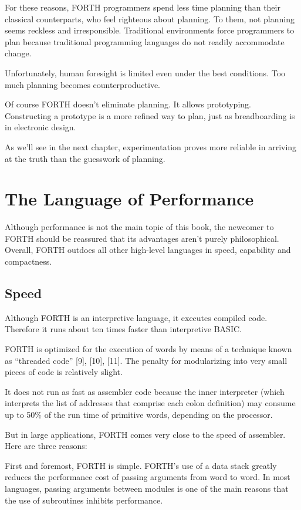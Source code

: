 For these reasons, FORTH programmers spend less time planning than
their classical counterparts, who feel righteous about planning. To
them, not planning seems reckless and irresponsible. Traditional environments
force programmers to plan because traditional programming languages
do not readily accommodate change.

Unfortunately, human foresight is limited even under the best conditions.
Too much planning becomes counterproductive.

Of course FORTH doesn't eliminate planning. It allows prototyping.
Constructing a prototype is a more refined way to plan, just as breadboarding
is in electronic design.

As we'll see in the next chapter, experimentation proves more reliable
in arriving at the truth than the guesswork of planning.


\section*{The Language of Performance}

Although performance is not the main topic of this book, the newcomer
to FORTH should be reassured that its advantages aren't purely philosophical.
Overall, FORTH outdoes all other high-level languages in speed, capability
and compactness.


\subsection*{Speed}

Although FORTH is an interpretive language, it executes compiled code.
Therefore it runs about ten times faster than interpretive BASIC.

FORTH is optimized for the execution of words by means of a technique
known as {}``threaded code'' {[}9{]}, {[}10{]}, {[}11{]}. The penalty
for modularizing into very small pieces of code is relatively slight.

It does not run as fast as assembler code because the inner interpreter
(which interprets the list of addresses that comprise each colon definition)
may consume up to 50\% of the run time of primitive words, depending
on the processor.

But in large applications, FORTH comes very close to the speed of
assembler. Here are three reasons:

First and foremost, FORTH is simple. FORTH's use of a data stack greatly
reduces the performance cost of passing arguments from word to word.
In most languages, passing arguments between modules is one of the
main reasons that the use of subroutines inhibits performance.

